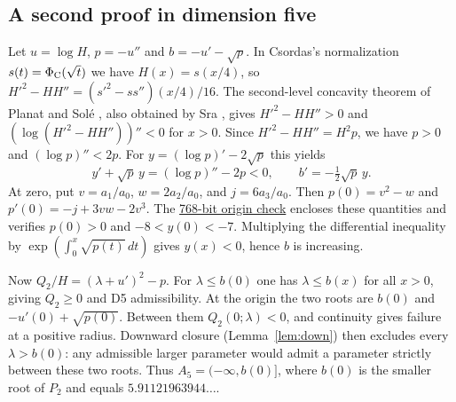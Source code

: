 \documentclass[11pt]{article}
\theoremstyle{remark}
\begin{document}
\subsection*{A second proof in dimension five}
Let $u=\log H$, $p=-u''$ and $b=-u'-\sqrt p$. In Csordas's normalization
$s(t)=\Phi_{\rm C}(\sqrt t)$ we have $H(x)=s(x/4)$, so
$H'^2-HH''=(s'^2-ss'')(x/4)/16$. The second-level concavity theorem of
Planat and Sol\'e \cite{PS}, also obtained by Sra \cite{Sra}, gives
$H'^2-HH''>0$ and $(\log(H'^2-HH''))''<0$ for $x>0$.
Since $H'^2-HH''=H^2p$, we have $p>0$ and $(\log p)''<2p$.
For $y=(\log p)'-2\sqrt p$ this yields
\[
  y'+\sqrt p\,y=(\log p)''-2p<0,\qquad b'=-\tfrac12\sqrt p\,y.
\]
At zero, put $v=a_1/a_0$, $w=2a_2/a_0$, and $j=6a_3/a_0$.
Then $p(0)=v^2-w$ and $p'(0)=-j+3vw-2v^3$.
The \href{https://github.com/iqwalker-debug/xi-positive-definiteness-/blob/074c0c9cacd5085a778c4fd94edd46fcd68dd729/paper-ii/check_export.py}{768-bit origin check}
encloses these quantities and verifies $p(0)>0$ and $-8<y(0)<-7$.
Multiplying the differential inequality by
$\exp(\int_0^x\sqrt{p(t)}\,dt)$ gives $y(x)<0$, hence $b$ is increasing.

Now $Q_2/H=(\lambda+u')^2-p$. For $\lambda\le b(0)$ one has
$\lambda\le b(x)$ for all $x>0$, giving $Q_2\ge0$ and D5 admissibility.
At the origin the two roots are $b(0)$ and $-u'(0)+\sqrt{p(0)}$.
Between them $Q_2(0;\lambda)<0$, and continuity gives failure at a positive
radius. Downward closure (Lemma~\ref{lem:down}) then excludes every
$\lambda>b(0)$: any admissible larger parameter would admit a parameter
strictly between these two roots. Thus $A_5=(-\infty,b(0)]$, where
$b(0)$ is the smaller root of $P_2$ and equals $5.91121963944\ldots$.
\end{document}
